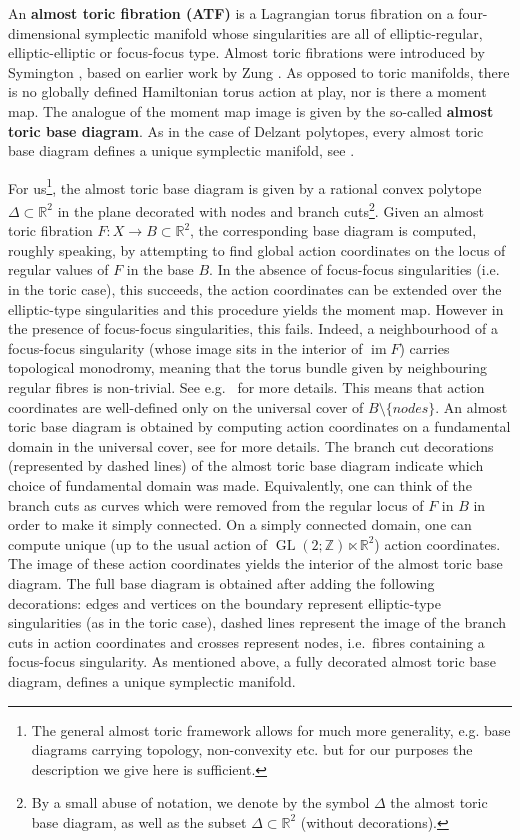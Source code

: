 \documentclass[12pt,a4paper,draft]{scrartcl}
\DeclareMathOperator{\im}{im}
\begin{document}
An \textbf{almost toric fibration (ATF)} is a Lagrangian torus fibration on a four-dimensional symplectic manifold whose singularities are all of elliptic-regular, elliptic-elliptic or focus-focus type. Almost toric fibrations were introduced by Symington \cite{symington2002FourDF}, based on earlier work by Zung \cite{Zun96,Zun97,Zun03}. As opposed to toric manifolds, there is no globally defined Hamiltonian torus action at play, nor is there a moment map. The analogue of the moment map image is given by the so-called \textbf{almost toric base diagram}. As in the case of Delzant polytopes, every almost toric base diagram defines a unique symplectic manifold, see \cite[Corollary 5.4]{symington2002FourDF} \cite[Theorem 8.5]{evans2021atfs}. 

For us\footnote{The general almost toric framework allows for much more generality, e.g. base diagrams carrying topology, non-convexity etc. but for our purposes the description we give here is sufficient.}, the almost toric base diagram is given by a rational convex polytope $\Delta \subset \mathbb{R}^2$ in the plane decorated with nodes and branch cuts\footnote{By a small abuse of notation, we denote by the symbol $\Delta$ the almost toric base diagram, as well as the subset $\Delta \subset \mathbb{R}^2$ (without decorations).}. Given an almost toric fibration $F \colon X \rightarrow B \subset \mathbb{R}^2$, the corresponding base diagram is computed, roughly speaking, by attempting to find global action coordinates on the locus of regular values of $F$ in the base $B$. In the absence of focus-focus singularities (i.e. in the toric case), this succeeds, the action coordinates can be extended over the elliptic-type singularities and this procedure yields the moment map. However in the presence of focus-focus singularities, this fails. Indeed, a neighbourhood of a focus-focus singularity (whose image sits in the interior of $\im F$) carries topological monodromy, meaning that the torus bundle given by neighbouring regular fibres is non-trivial. See e.g.\ \cite{Zun97} for more details. This means that action coordinates are well-defined only on the universal cover of $B \setminus \{nodes\}$. An almost toric base diagram is obtained by computing action coordinates on a fundamental domain in the universal cover, see \cite[Definition 8.3]{evans2021atfs} for more details. The branch cut decorations (represented by dashed lines) of the almost toric base diagram indicate which choice of fundamental domain was made. Equivalently, one can think of the branch cuts as curves which were removed from the regular locus of $F$ in $B$ in order to make it simply connected. On a simply connected domain, one can compute unique (up to the usual action of $\operatorname{GL}(2;\mathbb{Z}) \ltimes \mathbb{R}^2$) action coordinates. The image of these action coordinates yields the interior of the almost toric base diagram. The full base diagram is obtained after adding the following decorations: edges and vertices on the boundary represent elliptic-type singularities (as in the toric case), dashed lines represent the image of the branch cuts in action coordinates and crosses represent nodes, i.e.\ fibres containing a focus-focus singularity. As mentioned above, a fully decorated almost toric base diagram, defines a unique symplectic manifold.
\end{document}
